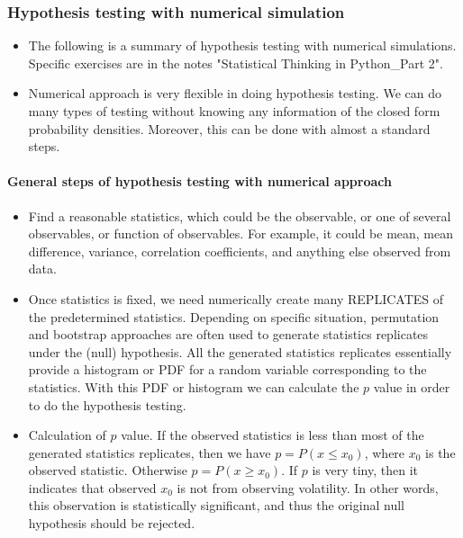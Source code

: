 \documentclass[11pt]{article}
\providecommand{\tightlist}{%
      \setlength{\itemsep}{0pt}\setlength{\parskip}{0pt}}
\begin{document}
    \subsubsection{Hypothesis testing with numerical
simulation}\label{hypothesis-testing-with-numerical-simulation}

\begin{itemize}
\tightlist
\item
  The following is a summary of hypothesis testing with numerical
  simulations. Specific exercises are in the notes "Statistical Thinking
  in Python\_Part 2".
\item
  Numerical approach is very flexible in doing hypothesis testing. We
  can do many types of testing without knowing any information of the
  closed form probability densities. Moreover, this can be done with
  almost a standard steps.
\end{itemize}

    \paragraph{General steps of hypothesis testing with numerical
approach}\label{general-steps-of-hypothesis-testing-with-numerical-approach}

\begin{itemize}
\item
  Find a reasonable statistics, which could be the observable, or one of
  several observables, or function of observables. For example, it could
  be mean, mean difference, variance, correlation coefficients, and
  anything else observed from data.
\item
  Once statistics is fixed, we need numerically create many REPLICATES
  of the predetermined statistics. Depending on specific situation,
  permutation and bootstrap approaches are often used to generate
  statistics replicates under the (null) hypothesis. All the generated
  statistics replicates essentially provide a histogram or PDF for a
  random variable corresponding to the statistics. With this PDF or
  histogram we can calculate the \(p\) value in order to do the
  hypothesis testing.
\item
  Calculation of \(p\) value. If the observed statistics is less than
  most of the generated statistics replicates, then we have
  \(p = P(x \leq x_0)\), where \(x_0\) is the observed statistic.
  Otherwise \(p = P(x \geq x_0)\). If \(p\) is very tiny, then it
  indicates that observed \(x_0\) is not from observing volatility. In
  other words, this observation is statistically significant, and thus
  the original null hypothesis should be rejected.
\end{itemize}
\end{document}
